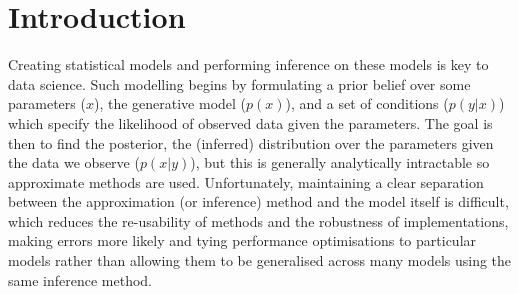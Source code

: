 \documentclass[sigconf]{acmart}
\begin{document}



\maketitle

\section{Introduction}
\label{s:introduction}

Creating statistical models and performing inference on these models is key to data science. Such modelling begins by formulating a prior belief over some parameters ($x$), the generative model ($p(x)$), and a set of conditions ($p(y|x)$) which specify the likelihood of observed data given the parameters. The goal is then to find the posterior, the (inferred) distribution over the parameters given the data we observe ($p(x|y)$), but  this is generally analytically intractable so approximate methods are used. Unfortunately,  maintaining a clear separation between the approximation (or inference) method and the model itself is difficult, which reduces the re-usability of methods and the robustness of implementations, making errors more likely and tying  performance optimisations to particular models rather than allowing them to be generalised across many models using the same inference method.
\end{document}

